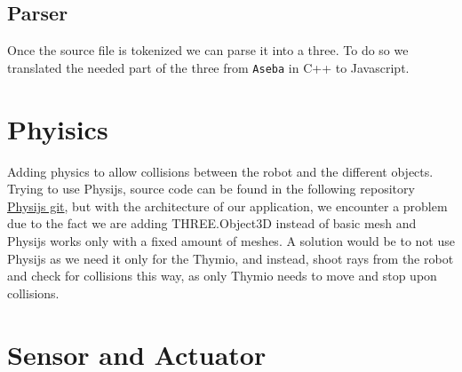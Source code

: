 \documentclass{scrbook}
\begin{document}
\subsection{Parser}

Once the source file is tokenized we can parse it into a three. To do so we translated the needed part of the three from \texttt{Aseba} in C++ to Javascript.


\section{Phyisics}

Adding physics to allow collisions between the robot and the different objects. Trying to use Physijs, source code can be found in the following repository \href{https://github.com/chandlerprall/Physijs/wiki/Basic-Setup}{Physijs git}, 
but with the architecture of our application, we encounter a problem due to the fact we are adding THREE.Object3D instead of basic mesh and Physijs works only with a fixed amount of meshes. A solution would be to not use Physijs as we need it only for the Thymio,
and instead, shoot rays from the robot and check for collisions this way, as only Thymio needs to move and stop upon collisions.

\section{Sensor and Actuator}
\end{document}
